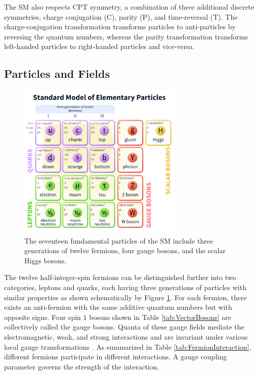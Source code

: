 The SM also respects CPT symmetry, a combination of three additional discrete symmetries, charge conjugation (C), parity (P), and time-reversal (T). The charge-conjugation transformation transforms particles to anti-particles by reversing the quantum numbers, whereas the parity transformation transforms left-handed particles to right-handed particles and vice-versa.

\subsection{Particles and Fields}
\label{subsec:Constituents}

\begin{figure}[!htb]
    \centering
    \includegraphics[width=0.7\textwidth] {figures/Theory/SMparticles.pdf}\hspace{1cm}
    \caption{ The seventeen fundamental particles of the SM include three generations of twelve fermions, four gauge bosons, and the scalar Higgs bosons. \cite{SMFigureWiki}}
    \label{fig:SM}
\end{figure}

The twelve half-integer-spin fermions can be distinguished further into two categories, leptons and quarks, each having three generations of particles with similar properties as shown schematically by Figure \ref{fig:SM}. For each fermion, there exists an anti-fermion with the same additive quantum numbers but with opposite signs. Four spin $1$ bosons shown in Table \ref{tab:VectorBosons} are collectively called the gauge bosons. Quanta of these gauge fields mediate the electromagnetic, weak, and strong interactions and are invariant under various local gauge transformations \cite{Bernabeu2021}. As summarized in Table \ref{tab:FermionInteraction}, different fermions participate in different interactions. A gauge coupling parameter governs the strength of the interaction.

